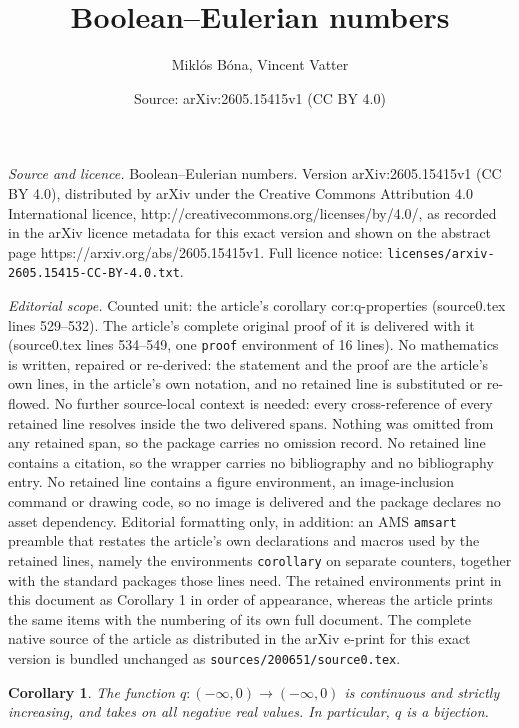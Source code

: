 \documentclass[10pt,a4paper]{amsart}
\title{\sc Boolean--Eulerian numbers}
\author{Mikl\'os B\'ona, Vincent Vatter}
\date{Source: arXiv:2605.15415v1 (CC BY 4.0)}
\newtheorem{corollary}{Corollary}
\begin{document}
\maketitle

\noindent\emph{Source and licence.} \sc Boolean--Eulerian numbers. Version arXiv:2605.15415v1 (CC BY 4.0), distributed by arXiv under the Creative Commons Attribution 4.0 International licence, http://creativecommons.org/licenses/by/4.0/, as recorded in the arXiv licence metadata for this exact version and shown on the abstract page https://arxiv.org/abs/2605.15415v1. Full licence notice: \texttt{licenses/arxiv-2605.15415-CC-BY-4.0.txt}.\par\smallskip

\noindent\textit{Editorial scope.} Counted unit: the article's corollary cor:q-properties (source0.tex lines 529--532). The article's complete original proof of it is delivered with it (source0.tex lines 534--549, one \texttt{proof} environment of 16 lines). No mathematics is written, repaired or re-derived: the statement and the proof are the article's own lines, in the article's own notation, and no retained line is substituted or re-flowed.  No further source-local context is needed: every cross-reference of every retained line resolves inside the two delivered spans.  Nothing was omitted from any retained span, so the package carries no omission record.  No retained line contains a citation, so the wrapper carries no bibliography and no bibliography entry.  No retained line contains a figure environment, an image-inclusion command or drawing code, so no image is delivered and the package declares no asset dependency.  Editorial formatting only, in addition: an AMS \texttt{amsart} preamble that restates the article's own declarations and macros used by the retained lines, namely the environments \texttt{corollary} on separate counters, together with the standard packages those lines need.  The retained environments print in this document as Corollary 1 in order of appearance, whereas the article prints the same items with the numbering of its own full document.  The complete native source of the article as distributed in the arXiv e-print for this exact version is bundled unchanged as \texttt{sources/200651/source0.tex}.
\begin{corollary}
\label{cor:q-properties}
The function $q\colon (-\infty, 0) \to (-\infty, 0)$ is continuous and strictly increasing, and takes on all negative real values. In particular, $q$ is a bijection.
\end{corollary}
\end{document}
